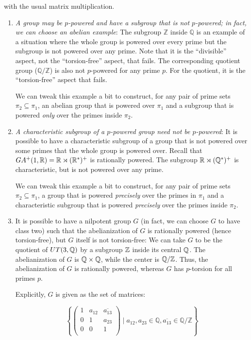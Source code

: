 with the usual matrix multiplication.
\begin{enumerate}
\item {\em A group may be $p$-powered and have a subgroup that is not
  $p$-powered; in fact, we can choose an abelian example}: The
  subgroup $\mathbb{Z}$ inside $\mathbb{Q}$ is an example of a
  situation where the whole group is powered over every prime but the
  subgroup is not powered over any prime. Note that it is the
  ``divisible'' aspect, not the ``torsion-free'' aspect, that
  fails. The corresponding quotient group ($\mathbb{Q}/\mathbb{Z}$) is
  also not $p$-powered for any prime $p$. For the quotient, it is the
  ``torsion-free'' aspect that fails.

  We can tweak this example a bit to construct, for any pair of prime
  sets $\pi_2 \subseteq \pi_1$, an abelian group that is powered over
  $\pi_1$ and a subgroup that is powered {\em only} over the primes
  inside $\pi_2$.
\item {\em A characteristic subgroup of a $p$-powered group need not
  be $p$-powered}: It is possible to have a characteristic subgroup of
  a group that is not powered over some primes that the whole group is
  powered over. Recall that $GA^+(1,\mathbb{R}) = \mathbb{R} \rtimes (\mathbb{R}^*)^+$ is
  rationally powered. The subgroup $\mathbb{R} \rtimes (\mathbb{Q}^*)^+$ is
  characteristic, but is not powered over any prime.  

  We can tweak this example a bit to construct, for any pair of prime
  sets $\pi_2 \subseteq \pi_1$, a group that is powered {\em
    precisely} over the primes in $\pi_1$ and a characteristic
  subgroup that is powered {\em precisely} over the primes inside
  $\pi_2$.

\item It is possible to have a nilpotent group $G$ (in fact, we can
  choose $G$ to have class two) such that the abelianization of $G$ is
  rationally powered (hence torsion-free), but $G$ itself is not
  torsion-free: We can take $G$ to be the quotient of $UT(3,\mathbb{Q})$ by a
  subgroup $\mathbb{Z}$ inside its central $\mathbb{Q}$. The abelianization of $G$ is
  $\mathbb{Q} \times \mathbb{Q}$, while the center is $\mathbb{Q}/\mathbb{Z}$. Thus, the
  abelianization of $G$ is rationally powered, whereas $G$ has
  $p$-torsion for all primes $p$.

  Explicitly, $G$ is given as the set of matrices:

  $$\left \{ \begin{pmatrix} 1 & a_{12} & \overline{a_{13}} \\ 0 & 1 & a_{23} \\ 0 & 0 & 1 \\\end{pmatrix} \mid a_{12},a_{23} \in \mathbb{Q}, \overline{a_{13}} \in \mathbb{Q}/\mathbb{Z} \right \}$$
    

\end{enumerate}
